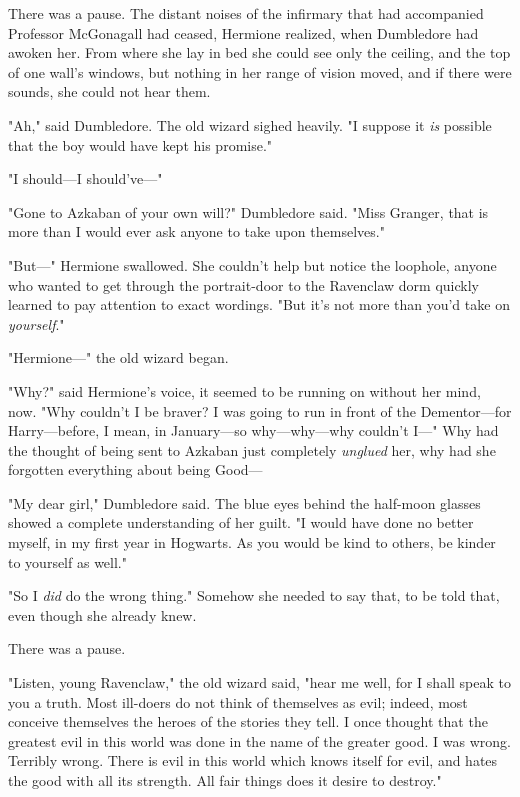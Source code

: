 There was a pause. The distant noises of the infirmary that had accompanied
Professor McGonagall had ceased, Hermione realized, when Dumbledore had awoken
her. From where she lay in bed she could see only the ceiling, and the top of
one wall's windows, but nothing in her range of vision moved, and if there were
sounds, she could not hear them.

"Ah," said Dumbledore. The old wizard sighed heavily. "I suppose it \emph{is}
possible that the boy would have kept his promise."

"I should---I should've---"

"Gone to Azkaban of your own will?" Dumbledore said. "Miss Granger, that is
more than I would ever ask anyone to take upon themselves."

"But---" Hermione swallowed. She couldn't help but notice the loophole, anyone
who wanted to get through the portrait-door to the Ravenclaw dorm quickly
learned to pay attention to exact wordings. "But it's not more than you'd take
on \emph{yourself}."

"Hermione---" the old wizard began.

"Why?" said Hermione's voice, it seemed to be running on without her mind, now.
"Why couldn't I be braver? I was going to run in front of the Dementor---for
Harry---before, I mean, in January---so why---why---why couldn't I---" Why had
the thought of being sent to Azkaban just completely \emph{unglued} her, why
had she forgotten everything about being Good---

"My dear girl," Dumbledore said. The blue eyes behind the half-moon glasses
showed a complete understanding of her guilt. "I would have done no better
myself, in my first year in Hogwarts. As you would be kind to others, be kinder
to yourself as well."

"So I \emph{did} do the wrong thing." Somehow she needed to say that, to be
told that, even though she already knew.

There was a pause.

"Listen, young Ravenclaw," the old wizard said, "hear me well, for I shall
speak to you a truth. Most ill-doers do not think of themselves as evil;
indeed, most conceive themselves the heroes of the stories they tell. I once
thought that the greatest evil in this world was done in the name of the
greater good. I was wrong. Terribly wrong. There is evil in this world which
knows itself for evil, and hates the good with all its strength. All fair
things does it desire to destroy."

